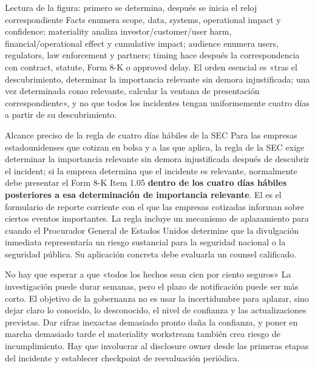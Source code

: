\documentclass[a4paper]{article}
\begin{document}
\begin{knowledgebox}{Lectura de la figura: primero se determina, después se inicia el reloj correspondiente}
Facts enumera scope, data, systems, operational impact y confidence; materiality analiza investor/customer/user harm, financial/operational effect y cumulative impact; audience enumera users, regulators, law enforcement y partners; timing hace después la correspondencia con contract, statute, Form 8-K o approved delay. El orden esencial es «tras el descubrimiento, determinar la importancia relevante sin demora injustificada; una vez determinada como relevante, calcular la ventana de presentación correspondiente», y no que todos los incidentes tengan uniformemente cuatro días a partir de su descubrimiento.
\end{knowledgebox}

\begin{importantbox}{Alcance preciso de la regla de cuatro días hábiles de la SEC}
Para las empresas estadounidenses que cotizan en bolsa y a las que aplica, la regla de la SEC exige determinar la importancia relevante sin demora injustificada después de descubrir el incident; si la empresa determina que el incidente es relevante, normalmente debe presentar el Form 8-K Item 1.05 \textbf{dentro de los cuatro días hábiles posteriores a esa determinación de importancia relevante}. El  es el formulario de reporte corriente con el que las empresas cotizadas informan sobre ciertos eventos importantes. La regla incluye un mecanismo de aplazamiento para cuando el Procurador General de Estados Unidos determine que la divulgación inmediata representaría un riesgo sustancial para la seguridad nacional o la seguridad pública. Su aplicación concreta debe evaluarla un counsel calificado.
\end{importantbox}

\begin{warningbox}{No hay que esperar a que «todos los hechos sean cien por ciento seguros»}
La investigación puede durar semanas, pero el plazo de notificación puede ser más corto. El objetivo de la gobernanza no es usar la incertidumbre para aplazar, sino dejar claro lo conocido, lo desconocido, el nivel de confianza y las actualizaciones previstas. Dar cifras inexactas demasiado pronto daña la confianza, y poner en marcha demasiado tarde el materiality workstream también crea riesgo de incumplimiento. Hay que involucrar al disclosure owner desde las primeras etapas del incidente y establecer checkpoint de reevaluación periódica.
\end{warningbox}
\end{document}
